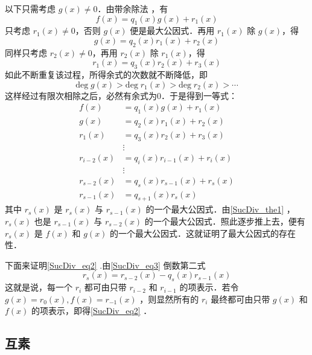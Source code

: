 以下只需考虑 $g(x)\neq 0$．由带余除法 ，有
\begin{equation}
f(x)=q_1(x)g(x)+r_1(x)
\end{equation}
只考虑 $r_1(x)\neq 0$，否则 $g(x)$ 便是最大公因式．再用 $r_1(x)$ 除 $g(x)$，得
\begin{equation}
g(x)=q_2(x)r_1(x)+r_2(x)
\end{equation}
同样只考虑 $r_2(x)\neq0$，再用 $r_2(x)$ 除 $r_1(x)$，得
\begin{equation}
r_1(x)=q_3(x)r_2(x)+r_3(x)
\end{equation}
如此不断重复该过程，所得余式的次数就不断降低，即
\begin{equation}
\mathrm{deg}\;g(x)>\mathrm{deg}\;r_1(x)>\mathrm{deg}\;r_2(x)>\cdots
\end{equation}
这样经过有限次相除之后，必然有余式为0．于是得到一等式：
\begin{equation}\label{SucDiv_eq3}
\begin{aligned}
f(x)&=q_1(x)g(x)+r_1(x)\\
g(x)&=q_2(x)r_1(x)+r_2(x)\\
r_1(x)&=q_3(x)r_2(x)+r_3(x)\\
&\vdots\\
r_{i-2}(x)&=q_i(x)r_{i-1}(x)+r_i(x)\\
&\vdots\\
r_{s-2}(x)&=q_s(x)r_{s-1}(x)+r_s(x)\\
r_{s-1}(x)&=q_{s+1}(x)r_s(x)
\end{aligned}
\end{equation}
其中 $r_s(x)$ 是 $r_s(x)$ 与 $r_{s-1}(x)$ 的一个最大公因式．由\autoref{SucDiv_the1} ，$r_s(x)$ 也是 $r_{s-1}(x)$ 与 $r_{s-2}(x)$ 的一个最大公因式．照此逐步推上去，便有 $r_s(x)$ 是 $f(x)$ 和 $g(x)$ 的一个最大公因式．这就证明了最大公因式的存在性．

下面来证明\autoref{SucDiv_eq2} .由\autoref{SucDiv_eq3} 倒数第二式
\begin{equation}
r_s(x)=r_{s-2}(x)-q_s(x)r_{s-1}(x)
\end{equation}
这就是说，每一个 $r_i$ 都可由只带 $r_{i-2}$ 和 $r_{i-1}$ 的项表示．若令 $g(x)=r_0(x),f(x)=r_{-1}(x)$ ，则显然所有的 $r_i$ 最终都可由只带 $g(x)$ 和 $f(x)$ 的项表示，即得\autoref{SucDiv_eq2} ．
\subsection{互素}
